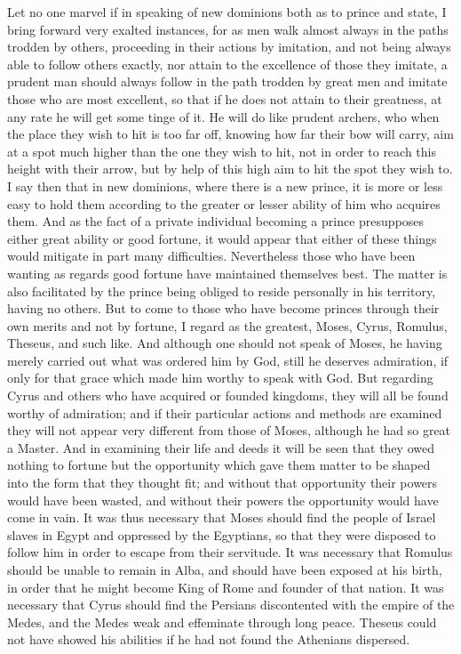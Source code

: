 \documentclass[12pt,letterpaper]{memoir}
\begin{document}
Let no one marvel if in speaking of new dominions both as to prince
and state, I bring forward very exalted instances, for as men walk
almost always in the paths trodden by others, proceeding in their
actions by imitation, and not being always able to follow others
exactly, nor attain to the excellence of those they imitate, a prudent
man should always follow in the path trodden by great men and imitate
those who are most excellent, so that if he does not attain to their
greatness, at any rate he will get some tinge of it. He will do like
prudent archers, who when the place they wish to hit is too far off,
knowing how far their bow will carry, aim at a spot much higher than
the one they wish to hit, not in order to reach this height with
their arrow, but by help of this high aim to hit the spot they wish
to. I say then that in new dominions, where there is a new prince,
it is more or less easy to hold them according to the greater or
lesser ability of him who acquires them. And as the fact of a private
individual becoming a prince presupposes either great ability or good
fortune, it would appear that either of these things would mitigate
in part many difficulties. Nevertheless those who have been wanting
as regards good fortune have maintained themselves best. The matter
is also facilitated by the prince being obliged to reside personally
in his territory, having no others. But to come to those who have
become princes through their own merits and not by fortune, I regard
as the greatest, Moses, Cyrus, Romulus, Theseus, and such like. And
although one should not speak of Moses, he having merely carried out
what was ordered him by God, still he deserves admiration, if only
for that grace which made him worthy to speak with God. But regarding
Cyrus and others who have acquired or founded kingdoms, they will all
be found worthy of admiration; and if their particular actions and
methods are examined they will not appear very different from those of
Moses, although he had so great a Master. And in examining their life
and deeds it will be seen that they owed nothing to fortune but the
opportunity which gave them matter to be shaped into the form that they
thought fit; and without that opportunity their powers would have been
wasted, and without their powers the opportunity would have come in
vain. It was thus necessary that Moses should find the people of Israel
slaves in Egypt and oppressed by the Egyptians, so that they were
disposed to follow him in order to escape from their servitude. It was
necessary that Romulus should be unable to remain in Alba, and should
have been exposed at his birth, in order that he might become King of
Rome and founder of that nation. It was necessary that Cyrus should
find the Persians discontented with the empire of the Medes, and the
Medes weak and effeminate through long peace. Theseus could not have
showed his abilities if he had not found the Athenians dispersed.
\end{document}
